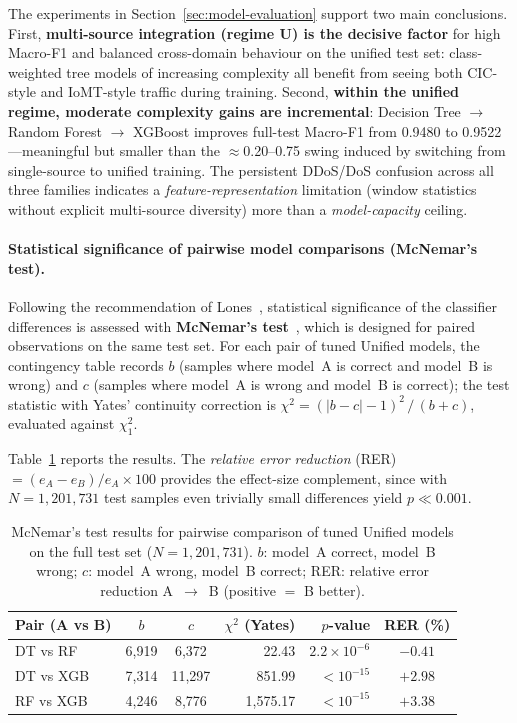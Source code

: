 The experiments in Section~\ref{sec:model-evaluation} support two main conclusions. First, \textbf{multi-source integration (regime U) is the decisive factor} for high Macro-F1 and balanced cross-domain behaviour on the unified test set: class-weighted tree models of increasing complexity all benefit from seeing both CIC-style and IoMT-style traffic during training. Second, \textbf{within the unified regime, moderate complexity gains are incremental}: Decision Tree $\to$ Random Forest $\to$ XGBoost improves full-test Macro-F1 from 0.9480 to 0.9522---meaningful but smaller than the $\approx$0.20--0.75 swing induced by switching from single-source to unified training. The persistent DDoS/DoS confusion across all three families indicates a \emph{feature-representation} limitation (window statistics without explicit multi-source diversity) more than a \emph{model-capacity} ceiling.

\paragraph{Statistical significance of pairwise model comparisons (McNemar's test).}
Following the recommendation of Lones~\cite{lones2024avoid}, statistical significance of the classifier differences is assessed with \textbf{McNemar's test}~\cite{mcnemar1947note}, which is designed for paired observations on the same test set. For each pair of tuned Unified models, the contingency table records $b$ (samples where model~A is correct and model~B is wrong) and $c$ (samples where model~A is wrong and model~B is correct); the test statistic with Yates' continuity correction is $\chi^2 = (|b-c|-1)^2\,/\,(b+c)$, evaluated against $\chi^2_1$.

Table~\ref{tab:mcnemar} reports the results. The \emph{relative error reduction} (RER) $= (e_A - e_B)/e_A \times 100$ provides the effect-size complement, since with $N=1{,}201{,}731$ test samples even trivially small differences yield $p \ll 0.001$.

\begin{table}[H]
\centering
\caption{McNemar's test results for pairwise comparison of tuned Unified models on the full test set ($N=1{,}201{,}731$). $b$: model~A correct, model~B wrong; $c$: model~A wrong, model~B correct; RER: relative error reduction A~$\to$~B (positive $=$ B better).}
\label{tab:mcnemar}
\small
\begin{tabular}{@{}l c c r r c@{}}
\toprule
\textbf{Pair (A vs B)} & $b$ & $c$ & $\chi^2$ (Yates) & $p$-value & \textbf{RER (\%)} \\
\midrule
DT vs RF  & 6,919 & 6,372 & 22.43 & $2.2 \times 10^{-6}$ & $-0.41$ \\
DT vs XGB & 7,314 & 11,297 & 851.99 & $< 10^{-15}$ & $+2.98$ \\
RF vs XGB & 4,246 & 8,776 & 1{,}575.17 & $< 10^{-15}$ & $+3.38$ \\
\bottomrule
\end{tabular}
\end{table}
\FloatBarrier

